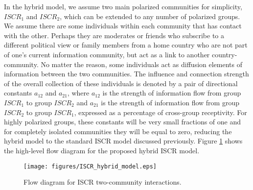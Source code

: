 In the hybrid model, we assume two main polarized communities for simplicity, $ISCR_1$ and $ISCR_2$, which can be extended to any number of polarized groups. We assume there are some individuals within each community that has contact with the other. Perhaps they are moderates or friends who subscribe to a different political view or family members from a home country who are not part of one's current information community, but act as a link to another country-community. No matter the reason, some individuals act as diffusion elements of information between the two communities. The influence and connection strength of the overall collection of these individuals is denoted by a pair of directional constants $a_{12}$ and $a_{21}$, where $a_{12}$ is the strength of information flow from group $ISCR_1$ to  group $ISCR_2$ and $a_{21}$ is the strength of information flow from group $ISCR_2$ to  group $ISCR_1$, expressed as a percentage of cross-group receptivity. For highly polarized groups, these constants will be very small fractions of one and for completely isolated communities they will be equal to zero, reducing the hybrid model to the standard ISCR model discussed previously. Figure \ref{fig:ISCR__hybrid_model} shows the high-level flow diagram for the proposed hybrid ISCR model.
\begin{figure}[!htbp] \centering
  \texttt{[image: figures/ISCR\_hybrid\_model.eps]}
  \caption{Flow diagram for ISCR two-community interactions.}
  \label{fig:ISCR__hybrid_model}
\end{figure}

